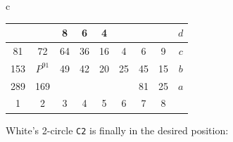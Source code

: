 \documentclass[12pt]{article}
\begin{document}
{{\begin{tabular}{c}
\begin{tabular}{|c|c|c|c|c|c|c|c||c}
\quad & \quad & \circlet{\,}8 & \circlet{\,}6 & \circlet{\,}4 & \quad & \quad & \quad & $d$ \\ \hline
\trianglepa{\,}81 & \trianglepa{\,}72 & \circlet{\,}64 & \circlet{\,}36 & \circlet{\,}16 & \circlet{\,}4 & \trianglepa{\,}6 & \trianglepa{\,}9 & $c$ \\ \hline
\squad{\,}153 & \rhombus{\,}$P^{91}$ & \trianglepa{\,}49 & \trianglepa{\,}42 & \trianglepa{\,}20 & \trianglepa{\,}25 & \squad{\,}45 & \squad{\,}15 & $b$ \\ \hline
\squad{\,}289 & \squad{\,}169 & \quad & \quad & \quad & \quad & \squad{\,}81 & \squad{\,}25 & $a$ \\ \hline
1 & 2 & 3 & 4 & 5 & 6 & 7 & 8 & \\
\end{tabular}
\end{tabular}
}}

\noindent
White's 2-circle {\tt C2} is finally in the desired position:
\end{document}
